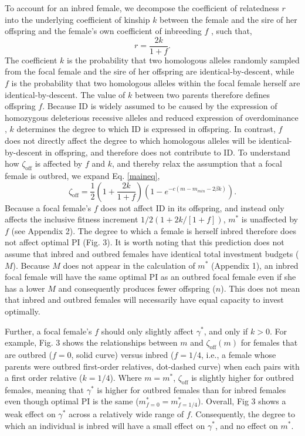 \documentclass[12pt]{article}
\begin{document}
To account for an inbred female, we decompose the coefficient of relatedness $r$ into the underlying coefficient of kinship $k$ between the female and the sire of her offspring and the female's own coefficient of inbreeding $f$  \cite[see][]{Hamilton1972, Michod1979}, such that,
\begin{equation} \label{rdef}
r = \frac{2k}{1 + f}.
\end{equation}
The coefficient $k$ is the probability that two homologous alleles randomly sampled from the focal female and the sire of her offspring are identical-by-descent, while $f$ is the probability that two homologous alleles within the focal female herself are identical-by-descent. The value of $k$ between two parents therefore defines offspring $f$. Because ID is widely assumed to be caused by the expression of homozygous deleterious recessive alleles and reduced expression of overdominance \cite[][]{Charlesworth2009}, $k$ determines the degree to which ID is expressed in offspring. In contrast, $f$ does not directly affect the degree to which homologous alleles will be identical-by-descent in offspring, and therefore does not contribute to ID. To understand how $\zeta_{\textrm{off}}$ is affected by $f$ and $k$, and thereby relax the assumption that a focal female is outbred, we expand Eq. \ref{maineq},
\begin{equation} \label{maineqr}
\zeta_{\textrm{off}} = \frac{1}{2}\left(1+\frac{2k}{1+f}\right)\left(1-e^{-c\left(m-m_{min}-2\beta k\right)}\right).
\end{equation}
Because a focal female's $f$ does not affect ID in its offspring, and instead only affects the inclusive fitness increment $1/2\left(1+ 2 k / \left[1 + f\right]\right)$, $m^{*}$ is unaffected by $f$  (see Appendix 2). The degree to which a female is herself inbred therefore does not affect optimal PI (Fig. 3). It is worth noting that this prediction does not assume that inbred and outbred females have identical total investment budgets ($M$). Because $M$ does not appear in the calculation of $m^{*}$ (Appendix 1), an inbred focal female will have the same optimal PI as an outbred focal female even if she has a lower $M$ and consequently produces fewer offspring ($n$). This does not mean that inbred and outbred females will necessarily have equal capacity to invest optimally.

Further, a focal female's $f$ should only slightly affect $\gamma^{*}$, and only if $k>0$. For example, Fig. 3 shows the relationships between $m$ and $\zeta_{\textrm{off}}(m)$ for females that are outbred ($f=0$, solid curve) versus inbred ($f=1/4$, i.e., a female whose parents were outbred first-order relatives, dot-dashed curve) when each pairs with a first order relative ($k=1/4$). Where $m=m^{*}$, $\zeta_{\textrm{off}}$ is slightly higher for outbred females, meaning that $\gamma^{*}$ is higher for outbred females than for inbred females even though optimal PI is the same ($m^{*}_{f=0}=m^{*}_{f=1/4}$). Overall, Fig 3 shows a weak effect on $\gamma^{*}$ across a relatively wide range of $f$. Consequently, the degree to which an individual is inbred will have a small effect on $\gamma^{*}$, and no effect on $m^{*}$.
\end{document}
